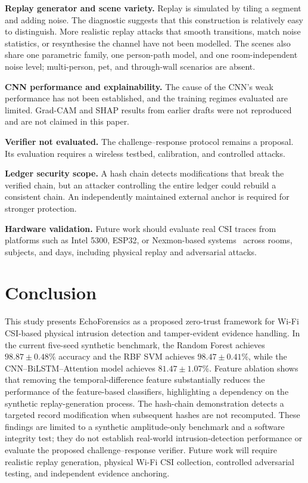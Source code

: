 \documentclass[conference]{IEEEtran}
\begin{document}
\textbf{Replay generator and scene variety.} Replay is simulated by tiling a segment and adding noise. The diagnostic suggests that this construction is relatively easy to distinguish. More realistic replay attacks that smooth transitions, match noise statistics, or resynthesise the channel have not been modelled. The scenes also share one parametric family, one person-path model, and one room-independent noise level; multi-person, pet, and through-wall scenarios are absent.

\textbf{CNN performance and explainability.} The cause of the CNN's weak performance has not been established, and the training regimes evaluated are limited. Grad-CAM and SHAP results from earlier drafts were not reproduced and are not claimed in this paper.

\textbf{Verifier not evaluated.} The challenge--response protocol remains a proposal. Its evaluation requires a wireless testbed, calibration, and controlled attacks.

\textbf{Ledger security scope.} A hash chain detects modifications that break the verified chain, but an attacker controlling the entire ledger could rebuild a consistent chain. An independently maintained external anchor is required for stronger protection.

\textbf{Hardware validation.} Future work should evaluate real CSI traces from platforms such as Intel 5300, ESP32, or Nexmon-based systems~\cite{gringoli2019} across rooms, subjects, and days, including physical replay and adversarial attacks.

\section{Conclusion}
This study presents EchoForensics as a proposed zero-trust framework for Wi-Fi CSI-based physical intrusion detection and tamper-evident evidence handling. In the current five-seed synthetic benchmark, the Random Forest achieves $98.87\pm0.48\%$ accuracy and the RBF SVM achieves $98.47\pm0.41\%$, while the CNN--BiLSTM--Attention model achieves $81.47\pm1.07\%$. Feature ablation shows that removing the temporal-difference feature substantially reduces the performance of the feature-based classifiers, highlighting a dependency on the synthetic replay-generation process. The hash-chain demonstration detects a targeted record modification when subsequent hashes are not recomputed. These findings are limited to a synthetic amplitude-only benchmark and a software integrity test; they do not establish real-world intrusion-detection performance or evaluate the proposed challenge--response verifier. Future work will require realistic replay generation, physical Wi-Fi CSI collection, controlled adversarial testing, and independent evidence anchoring.
\end{document}
